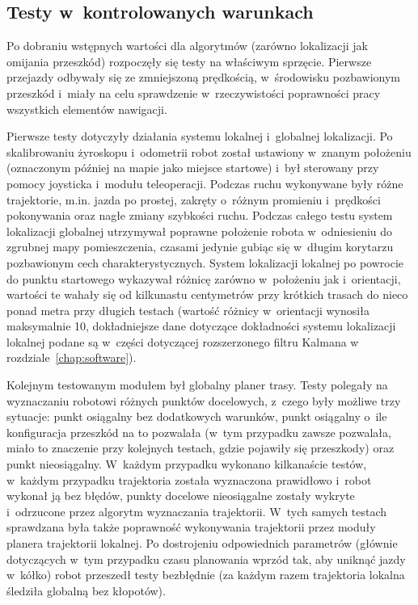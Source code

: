 \subsection{Testy w~kontrolowanych warunkach}

Po dobraniu wstępnych wartości dla algorytmów (zarówno lokalizacji jak 
omijania przeszkód) rozpoczęły się testy na właściwym sprzęcie. Pierwsze 
przejazdy odbywały się ze zmniejszoną prędkością, w~środowisku pozbawionym
przeszkód i~miały na celu sprawdzenie w~rzeczywistości poprawności pracy
wszystkich elementów nawigacji.

Pierwsze testy dotyczyły działania systemu lokalnej i~globalnej lokalizacji.
Po skalibrowaniu żyroskopu i~odometrii robot został ustawiony w~znanym położeniu
(oznaczonym później na mapie jako miejsce startowe) i~był sterowany przy pomocy
joysticka i~modułu teleoperacji. Podczas ruchu wykonywane były różne trajektorie,
m.in. jazda po prostej, zakręty o~różnym promieniu i~prędkości pokonywania
oraz nagłe zmiany szybkości ruchu. Podczas całego testu system lokalizacji 
globalnej utrzymywał poprawne położenie robota w~odniesieniu do zgrubnej mapy 
pomieszczenia, czasami jedynie gubiąc się w~długim korytarzu pozbawionym 
cech charakterystycznych. System lokalizacji lokalnej po powrocie do punktu 
startowego wykazywał różnicę zarówno w~położeniu jak i~orientacji, wartości
te wahały się od kilkunastu centymetrów przy krótkich trasach do nieco ponad
metra przy długich testach (wartość różnicy w~orientacji wynosiła maksymalnie 10\textdegree,
dokładniejsze dane dotyczące dokładności systemu lokalizacji lokalnej podane
są w~części dotyczącej rozszerzonego filtru Kalmana w rozdziale~\ref{chap:software}).

Kolejnym testowanym modułem był globalny planer trasy. Testy polegały na 
wyznaczaniu robotowi różnych punktów docelowych, z~czego były możliwe 
trzy sytuacje: punkt osiągalny bez dodatkowych warunków, punkt osiągalny 
o~ile konfiguracja przeszkód na to pozwalała (w~tym przypadku zawsze pozwalała, 
miało to znaczenie przy kolejnych testach, gdzie pojawiły się przeszkody) 
oraz punkt nieosiągalny. W~każdym przypadku wykonano kilkanaście testów,
w~każdym przypadku trajektoria została wyznaczona prawidłowo i~robot wykonał
ją bez błędów, punkty docelowe nieosiągalne zostały wykryte i~odrzucone przez 
algorytm wyznaczania trajektorii. W~tych samych testach sprawdzana była także
poprawność wykonywania trajektorii przez moduły planera trajektorii lokalnej.
Po dostrojeniu odpowiednich parametrów (głównie dotyczących w~tym przypadku
czasu planowania wprzód tak, aby uniknąć jazdy w~kółko) robot przeszedł
testy bezbłędnie (za każdym razem trajektoria lokalna śledziła globalną 
bez kłopotów). 

